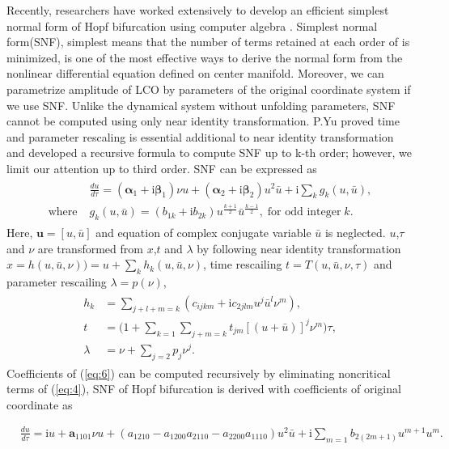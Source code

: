 \documentclass[openacc]{rsproca_new}%
\def\vec#1{\ensuremath{\mathbf{#1}}}
\newcommand{\Eref}[1]{(\ref{#1})}
\begin{document}
Recently, researchers have worked extensively to develop an efficient simplest normal form of Hopf bifurcation using computer algebra \cite{algaba1998hypernormal,yu1998computation}. Simplest normal form(SNF), simplest means that the number of terms retained at each order of is minimized, is one of the most effective ways to derive the normal form from the nonlinear differential equation defined on center manifold. Moreover, we can parametrize amplitude of LCO by parameters of the original coordinate system if we use SNF. Unlike the dynamical system without unfolding parameters, SNF cannot be computed using only near identity transformation. P.Yu \cite{yu2002simplest} proved time and parameter rescaling is essential additional to near identity transformation and developed a recursive formula to compute SNF up to k-th order; however, we limit our attention up to third order. SNF can be expressed as
\begin{align}\label{eq:5}
  \begin{split}
    &\frac{du}{d\tau}=(\vec{\alpha}_1+\textrm{i}\vec{\beta}_1)\nu u+(\vec{\alpha}_2+\textrm{i}\vec{\beta}_2) u^2 \bar{u}+\textrm{i}\sum_k g_k(u,\bar{u}),\\
    \textrm{where} \;  &g_k(u,\bar{u})=(b_{1k}+\textrm{i}b_{2k})u^{\frac{k+1}{2}}\bar{u}^{\frac{k-1}{2}}, \; \textrm{for odd integer} \;k.
  \end{split}
\end{align}
Here, \(\vec{u}=[u,\bar{u}]\) and equation of complex conjugate variable \(\bar{u}\) is neglected. \(u\),\(\tau\) and \(\nu\) are transformed from \(x\),\(t\) and \(\lambda\) by following near identity transformation
\(x=h(u,\bar{u},\nu))=u+\sum_k h_k(u,\bar{u},\nu)\), time rescailing \(t=T(u,\bar{u},\nu,\tau)\) and parameter rescailing \(\lambda=p(\nu)\),
\begin{align}\label{eq:6}
  \begin{split}
    h_k &=\sum_{j+l+m=k}(c_{ijkm}+\textrm{i}c_{2jlm}u^j\bar{u}^l \nu^m),\\
    t &=\Big(1+\sum_{k=1}\sum_{j+m=k}t_{jm}[(u+\bar{u})]^j\nu^m\Big)\tau,\\
    \lambda &=\nu+\sum_{j=2}p_j \nu^j.
  \end{split}
\end{align}
Coefficients of \Eref{eq:6} can be computed recursively \cite{yu2002simplest} by eliminating noncritical terms of \Eref{eq:4}, SNF of Hopf bifurcation is derived with coefficients of original coordinate as

\begin{align}\label{eq:9}
&\frac{du}{d\tau}=\textrm{i}u+\vec{a}_{1101}\nu u+(a_{1210}-a_{1200}a_{2110}-a_{2200}a_{1110})u^2\bar u+\textrm{i}\sum_{m=1}b_{2(2m+1)}u^{m+1}u^m.
\end{align}
\end{document}
